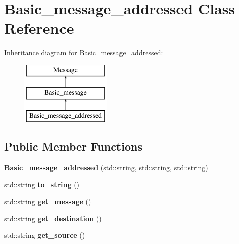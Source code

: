 \hypertarget{class_basic__message__addressed}{}\section{Basic\+\_\+message\+\_\+addressed Class Reference}
\label{class_basic__message__addressed}
Inheritance diagram for Basic\+\_\+message\+\_\+addressed\+:\begin{figure}[H]
\begin{center}
\leavevmode
\includegraphics[height=3.000000cm]{class_basic__message__addressed}
\end{center}
\end{figure}
\subsection*{Public Member Functions}
\begin{DoxyCompactItemize}
\item 
{\bfseries Basic\+\_\+message\+\_\+addressed} (std\+::string, std\+::string, std\+::string)\hypertarget{class_basic__message__addressed_a5c7a55bcaf411c56152cd8b0e0f11929}{}\label{class_basic__message__addressed_a5c7a55bcaf411c56152cd8b0e0f11929}

\item 
std\+::string {\bfseries to\+\_\+string} ()\hypertarget{class_basic__message__addressed_a52fac87b24ea958f475ee573613fbbf0}{}\label{class_basic__message__addressed_a52fac87b24ea958f475ee573613fbbf0}

\item 
std\+::string {\bfseries get\+\_\+message} ()\hypertarget{class_basic__message__addressed_a5baee82e6ce16d7c1efb631c9ada7189}{}\label{class_basic__message__addressed_a5baee82e6ce16d7c1efb631c9ada7189}

\item 
std\+::string {\bfseries get\+\_\+destination} ()\hypertarget{class_basic__message__addressed_aa6ecbe8903236c1048f84d142d68a637}{}\label{class_basic__message__addressed_aa6ecbe8903236c1048f84d142d68a637}

\item 
std\+::string {\bfseries get\+\_\+source} ()\hypertarget{class_basic__message__addressed_abedc94bfc1d681916eff93af24e17788}{}\label{class_basic__message__addressed_abedc94bfc1d681916eff93af24e17788}

\end{DoxyCompactItemize}
